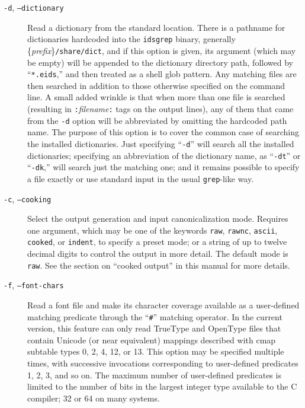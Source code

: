 \documentclass[twocolumn]{report}
\begin{document}
\begin{description}

\item[\texttt{-d}, \texttt{--dictionary}]
Read a dictionary
from the standard location.  There is a pathname for dictionaries hardcoded
into the \texttt{idsgrep} binary, generally
\{\emph{prefix}\}\texttt{/share/dict}, and if this option is given, its
argument (which may be empty) will be appended to the dictionary directory
path, followed by ``\texttt{*.eids},'' and then treated as a shell glob
pattern.  Any matching files are then searched in addition to those
otherwise specified on the command line.  A small added wrinkle is that when
more than one file is searched (resulting in
\texttt{:}\textit{filename}\texttt{:} tags on the output lines), any of them
that came from the \texttt{-d} option will be abbreviated by omitting the
hardcoded path name.  The purpose of this option is to cover the common case
of searching the installed dictionaries.  Just specifying ``\texttt{-d}''
will search all the installed dictionaries; specifying an abbreviation of
the dictionary name, as ``\texttt{-dt}'' or ``\texttt{-dk},'' will search
just the matching one; and it remains possible to specify a file exactly or
use standard input in the usual \texttt{grep}-like way.

\item[\texttt{-c}, \texttt{--cooking}]
Select the output generation and input canonicalization mode.  Requires one
argument, which may be one of the keywords \texttt{raw}, \texttt{rawnc},
\texttt{ascii}, \texttt{cooked}, or \texttt{indent}, to specify a preset
mode; or a string of up to twelve decimal digits to control the output in
more detail.  The default mode is \texttt{raw}.  See the
section on ``cooked output'' in this manual for more details.

\item[\texttt{-f}, \texttt{--font-chars}]
Read a font file and make its character coverage available as a user-defined
matching predicate through the ``\texttt{\#}'' matching operator.  In the
current version, this feature can only read TrueType and OpenType files that
contain Unicode (or near equivalent) mappings described with cmap subtable
types 0, 2, 4, 12, or 13.  This option may be specified multiple times, with
successive invocations corresponding to user-defined predicates 1, 2, 3, and
so on.  The maximum number of user-defined predicates is limited to the
number of bits in the largest integer type available to the C compiler; 32
or 64 on many systems.


\end{description}
\end{document}
